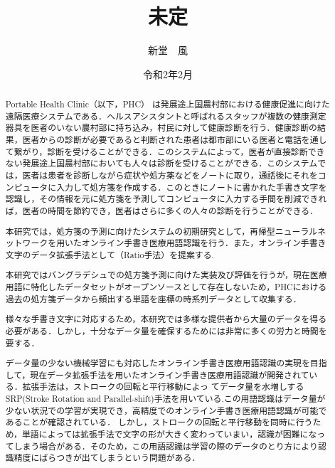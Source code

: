 \documentclass[a4paper,12pt]{jreport}
\title{未定}
\author{新堂　風}
\date{令和2年2月}
\begin{document}
\maketitle
\thispagestyle{empty}

\begin{abstract}
 Portable Health Clinic（以下，PHC） は発展途上国農村部における健康促進に向けた遠隔医療システムである．ヘルスアシスタントと呼ばれるスタッフが複数の健康測定器具を医者のいない農村部に持ち込み，村民に対して健康診断を行う．健康診断の結果，医者からの診断が必要であると判断された患者は都市部にいる医者と電話を通して繋がり，診断を受けることができる．このシステムによって，医者が直接診断できない発展途上国農村部においても人々は診断を受けることができる．このシステムでは，医者は患者を診断しながら症状や処方薬などをノートに取り，通話後にそれをコンピュータに入力して処方箋を作成する．このときにノートに書かれた手書き文字を認識し，その情報を元に処方箋を予測してコンピュータに入力する手間を削減できれば，医者の時間を節約でき，医者はさらに多くの人々の診断を行うことができる．

本研究では，処方箋の予測に向けたシステムの初期研究として，再帰型ニューラルネットワークを用いたオンライン手書き医療用語認識を行う．また，オンライン手書き文字のデータ拡張手法として（Ratio手法）を提案する.

本研究ではバングラデシュでの処方箋予測に向けた実装及び評価を行うが，現在医療用語に特化したデータセットがオープンソースとして存在しないため，PHCにおける過去の処方箋データから頻出する単語を座標の時系列データとして収集する．

様々な手書き文字に対応するため，本研究では多様な提供者から大量のデータを得る必要がある．しかし，十分なデータ量を確保するためには非常に多くの労力と時間を要する．

データ量の少ない機械学習にも対応したオンライン手書き医療用語認識の実現を目指して，現在データ拡張手法を用いたオンライン手書き医療用語認識が開発されている．拡張手法は，ストロークの回転と平行移動によっ てデータ量を水増しする SRP(Stroke Rotation and Parallel-shift)手法を用いている.この用語認識はデータ量が少ない状況での学習が実現でき，高精度でのオンライン手書き医療用語認識が可能であることが確認されている．
しかし，ストロークの回転と平行移動を同時に行うため，単語によっては拡張手法で文字の形が大きく変わっていまい，認識が困難になってしまう場合がある．そのため，この用語認識は学習の際のデータのとり方により認識精度にばらつきが出てしまうという問題がある．


\end{abstract}
\end{document}
